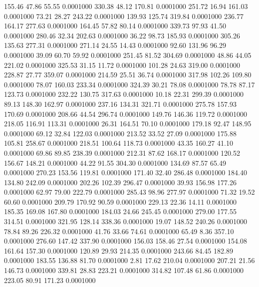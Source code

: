  155.46   47.86   55.55   0.0001000
 330.38   48.12  170.81   0.0001000
 251.72   16.94  161.03   0.0001000
  73.21   28.27  243.22   0.0001000
 139.93  125.74  319.84   0.0001000
 236.77  164.17  277.63   0.0001000
 164.45   57.82   80.14   0.0001000
 339.73   97.93   41.50   0.0001000
 280.46   32.34  202.63   0.0001000
  36.22   98.73  185.93   0.0001000
 305.26  135.63  277.31   0.0001000
 271.14   24.55   14.43   0.0001000
  92.60  131.96   96.29   0.0001000
  39.09   60.70   59.92   0.0001000
 251.45   81.52  304.69   0.0001000
  48.86   44.05  221.02   0.0001000
 325.53   31.15   11.72   0.0001000
 101.28   24.63  319.00   0.0001000
 228.87   27.77  359.07   0.0001000
 214.59   25.51   36.74   0.0001000
 317.98  102.26  109.80   0.0001000
  78.07  160.03  233.34   0.0001000
 324.39   30.21   78.08   0.0001000
  78.78   87.17  123.73   0.0001000
 232.22  130.75  317.63   0.0001000
  10.18   22.31  299.39   0.0001000
  89.13  148.30  162.97   0.0001000
 237.16  134.31  321.71   0.0001000
 275.78  157.93  170.69   0.0001000
 208.66   44.54  296.74   0.0001000
 149.76  146.36  119.72   0.0001000
 218.05  116.91  113.31   0.0001000
  26.31  164.51   70.10   0.0001000
 179.18   92.47  148.95   0.0001000
  69.12   32.84  122.03   0.0001000
 213.52   33.52   27.09   0.0001000
 175.88  105.81  258.67   0.0001000
 218.51  100.64  118.73   0.0001000
  43.35  160.27   41.10   0.0001000
  69.86   89.85  238.39   0.0001000
 212.31   87.62  168.17   0.0001000
 120.52  156.67  148.21   0.0001000
  44.22   91.55  304.30   0.0001000
 134.69   87.57   65.49   0.0001000
 270.23  153.56  119.81   0.0001000
 171.40   32.40  286.48   0.0001000
 184.40  134.80  242.09   0.0001000
 202.26  102.39  296.47   0.0001000
  39.93  156.98  177.26   0.0001000
  62.97   79.00  222.79   0.0001000
 285.43   98.96  277.97   0.0001000
  71.32   19.52   60.60   0.0001000
 209.79  170.92   90.59   0.0001000
 229.13   22.36   14.11   0.0001000
 185.35  169.08  167.80   0.0001000
 184.03   24.66  245.45   0.0001000
 279.00  177.55  314.51   0.0001000
 321.95  128.14  338.36   0.0001000
  19.07  148.52  240.26   0.0001000
  78.84   89.26  226.32   0.0001000
  41.76   33.66   74.61   0.0001000
  65.49    8.36  357.10   0.0001000
 276.60  147.42  337.90   0.0001000
 156.03  158.46   27.54   0.0001000
 154.08  161.64  157.30   0.0001000
 120.89   29.93  214.35   0.0001000
 243.66   84.45  182.89   0.0001000
 183.55  136.88   81.70   0.0001000
   2.81   17.62  210.04   0.0001000
 207.21   21.56  146.73   0.0001000
 339.81   28.83  223.21   0.0001000
 314.82  107.48   61.86   0.0001000
 223.05   80.91  171.23   0.0001000
